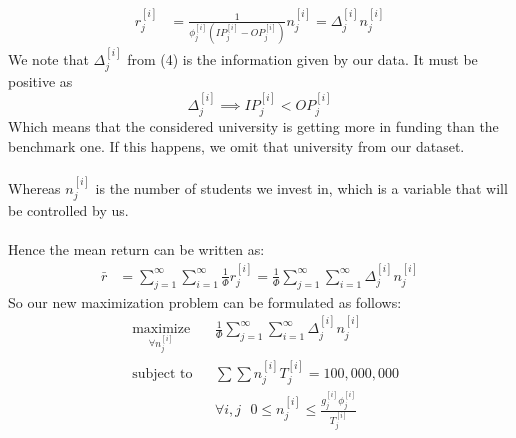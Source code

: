\documentclass[12pt]{scrartcl}
\begin{document}
		\begin{equation}
			\begin{aligned}
			r_j^{[i]} &= \frac{1 }{ \phi_j^{[i]} (IP_j^{[i]} - OP_j^{[i]} ) } n_j^{[i]} = \Delta_j^{[i]} n_j^{[i]}
			\end{aligned}
		\end{equation}	
		We note that $\Delta_j^{[i]}$ from (4) is the information given by our data. It must be positive as $$\Delta_j^{[i]}\implies IP_j^{[i]} < OP_j^{[i]}$$
		Which means that the considered university is getting more in funding than the benchmark one. If this happens, we omit that university from our dataset.\\ 
		\\
		Whereas $n_j^{[i]}$ is the number of students we invest in, which is a variable that will be controlled by us.\\
		\\
		Hence the mean return can be written as:
		\begin{align*}
			\bar{r} &= \sum_{j=1}^\infty\sum_{i=1}^\infty \frac{ 1  }{ \Phi } r_j^{[i]} = \frac{ 1  }{ \Phi }\sum_{j=1}^\infty\sum_{i=1}^\infty \Delta_j^{[i]}n_j^{[i]}
		\end{align*}
		So our new maximization problem can be formulated as follows:
		\begin{equation*}
				\begin{aligned}
					& \underset{\forall n_j^{[i]}}{\text{maximize}}
					& &\frac{ 1  }{ \Phi }\sum_{j=1}^\infty\sum_{i=1}^\infty \Delta_j^{[i]}n_j^{[i]}\\
					& \text{subject to}
					& & \sum \sum n_j^{[i]}T_j^{[i]} = 100,000,000\\
					&&& \forall i,j \ \ \ 0\le n_j^{[i]} \le \frac{g_j^{[i]}\phi_j^{[i]}}{T_j^{[i]}}
				\end{aligned}	
		\end{equation*}
		
\end{document}
